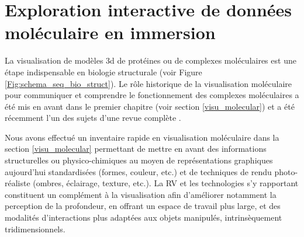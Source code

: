 
\chapter[Exploration interactive de données moléculaire en immersion]{Exploration interactive de données moléculaire en immersion}
\label{Sec:CantorDigitalis}
\minitoc
\cleardoublepage

La visualisation de modèles 3d de protéines ou de complexes moléculaires est une étape indispensable en biologie structurale (voir Figure \ref{Fig:schema_seq_bio_struct}). Le rôle historique de la visualisation moléculaire pour communiquer et comprendre le fonctionnement des complexes moléculaires a été mis en avant dans le premier chapitre (voir section \ref{visu_molecular}) et a été récemment l'un des sujets d'une revue complète \cite{kehrer_visualization_2013}.

Nous avons effectué un inventaire rapide en visualisation moléculaire dans la section \ref{visu_molecular} permettant de mettre en avant des informations structurelles ou physico-chimiques au moyen de représentations graphiques aujourd'hui standardisées (formes, couleur, etc.) et de techniques de rendu photo-réaliste (ombres, éclairage, texture, etc.). La RV et les technologies s'y rapportant constituent un complément à la visualisation afin d'améliorer notamment la perception de la profondeur, en offrant un espace de travail plus large, et des modalités d'interactions plus adaptées aux objets manipulés, intrinsèquement tridimensionnels.


